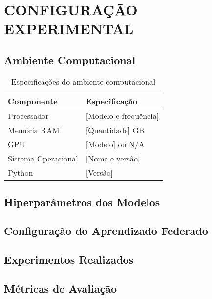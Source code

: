 \section{CONFIGURAÇÃO EXPERIMENTAL}

\subsection{Ambiente Computacional}

\begin{table}[H]
\centering
\begin{tabularx}{\textwidth}{|l|X|}
\hline
\bf Componente & \bf Especificação \\ \hline
Processador & [Modelo e frequência] \\ \hline
Memória RAM & [Quantidade] GB \\ \hline
GPU & [Modelo] ou N/A \\ \hline
Sistema Operacional & [Nome e versão] \\ \hline
Python & [Versão] \\ \hline
\end{tabularx}
\caption{Especificações do ambiente computacional}
\label{tab:hardware}
\end{table}

\subsection{Hiperparâmetros dos Modelos}

\subsection{Configuração do Aprendizado Federado}

\subsection{Experimentos Realizados}

\subsection{Métricas de Avaliação}
